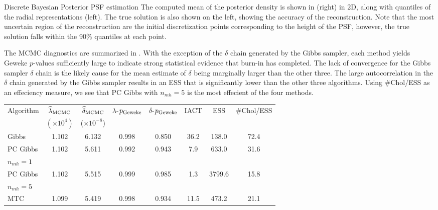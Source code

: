 \begin{chapter}{Discrete Bayesian Posterior PSF estimation}
The computed mean of the posterior density is shown in  (right) in 2D, along with quantiles of the radial representations (left). 
The true solution is also shown on the left, showing the accuracy of the reconstruction.  
Note that the most uncertain region of the reconstruction are the initial discretization points corresponding to the height of the PSF, however, the true solution falls within the 90\% quantiles at each point.

The MCMC diagnostics are summarized in . 
With the exception of the $\delta$ chain generated by the Gibbs sampler, each method yields Geweke $p$-values sufficiently large to indicate strong statistical evidence that burn-in has completed. 
The lack of convergence for the Gibbs sampler $\delta$ chain is the likely cause for the mean estimate of $\delta$ being marginally larger than the other three. 
The large autocorrelation in the $\delta$ chain generated by the Gibbs sampler results in an ESS that is significantly lower than the other three algorithms. 
Using \#Chol/ESS as an effeciency measure, we see that PC Gibbs with $n_{mh}=5$ is the most effecient of the four methods.
\begin{table}[h]
\begin{center}
  \begin{tabular}{l|ccccccc}
    \hline
    Algorithm       & $\hat{\lambda}_{\rm MCMC}$& $\hat{\delta}_{\rm MCMC}$  & $\lambda$-$p_{\rm Geweke}$&$\delta$-$p_{\rm Geweke}$& IACT & ESS    & \#Chol/ESS \\
     & $(\times 10^{4})$ & ($\times 10^{-8}$) & & \\
    \hline
	      Gibbs &                 1.102 &                 6.132 &                    0.998 &                    0.850& 36.2 &  138.0 &      72.4 \\
PC Gibbs &                 1.102 &                 5.611 &                    0.992 &                    0.943&  7.9 &  633.0 &      31.6 \\
\hspace{.2in} $n_{mh}= 1$ & & & & & & & \\
PC Gibbs &                 1.102 &                 5.515&                    0.999 &                    0.985&  1.3 & 3799.6 &      15.8 \\
\hspace{.2in} $n_{mh}= 5$ & & & & & & & \\
		MTC &                 1.099 &                 5.419 &                    0.998 &                    0.934& 11.5 &  473.2 &      21.1 \\

\end{tabular}
\end{center}
\end{table}
\end{chapter}
